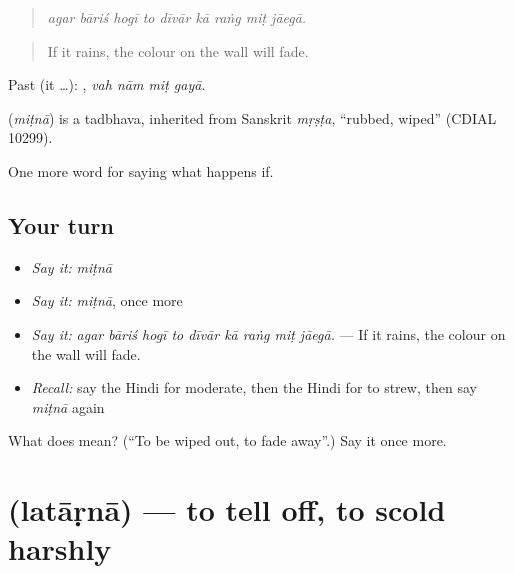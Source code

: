 \begin{quote}
        
\end{quote}

\begin{quote}
\emph{agar bāriś hogī to dīvār kā raṅg miṭ jāegā.}
\end{quote}

\begin{quote}
If it rains, the colour on the wall will fade.
\end{quote}

Past (it …):    , \emph{vah nām miṭ gayā}.

\begin{cousinweb}
\textbf{} (\emph{miṭnā}) is a tadbhava, inherited from Sanskrit \emph{mṛṣṭa}, \textquotedblleft{}rubbed, wiped\textquotedblright{} (CDIAL 10299).
\end{cousinweb}

\begin{grammarlens}[title={What you've built}]
One more word for saying what happens if.
\end{grammarlens}

\subsection*{Your turn}
\begin{itemize}
\raggedright
  \item \emph{Say it:} \emph{miṭnā}
  \item \emph{Say it:} \emph{miṭnā}, once more
  \item \emph{Say it:} \emph{agar bāriś hogī to dīvār kā raṅg miṭ jāegā.} — If it rains, the colour on the wall will fade.
  \item \emph{Recall:} say the Hindi for moderate, then the Hindi for to strew, then say \emph{miṭnā} again
\end{itemize}

\begin{tcolorbox}[breakable,colback=teal!4,colframe=teal!35!black,title={Before you move on}]
What does  mean? (\textquotedblleft{}To be wiped out, to fade away\textquotedblright{}.) Say it once more.
\end{tcolorbox}
\section[\texorpdfstring{\hi{लताड़ना} (latāṛnā)}{लताड़ना (latāṛnā)}]{ (latāṛnā) — to tell off, to scold harshly}

